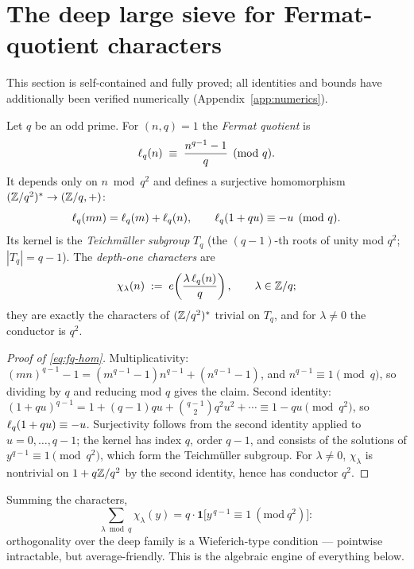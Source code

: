 \section{The deep large sieve for Fermat-quotient characters}\label{sec:dls}

This section is self-contained and fully proved; all identities and bounds
have additionally been verified numerically (Appendix~\ref{app:numerics}).

\begin{definition}\label{def:fq}
Let $q$ be an odd prime. For $(n,q)=1$ the \emph{Fermat quotient} is
\[
\ell_q(n)\;\equiv\;\frac{n^{q-1}-1}{q}\pmod q .
\]
It depends only on $n\bmod q^2$ and defines a surjective homomorphism
$(\mathbb{Z}/q^2)^*\to(\mathbb{Z}/q,+)$:
\begin{equation}\label{eq:fq-hom}
\ell_q(mn)=\ell_q(m)+\ell_q(n),
\qquad
\ell_q(1+qu)\equiv-u\pmod q .
\end{equation}
Its kernel is the \emph{Teichm\"uller subgroup} $T_q$ (the $(q-1)$-th
roots of unity mod $q^2$; $|T_q|=q-1$). The \emph{depth-one characters}
are
\[
\chi_\lambda(n)\;:=\;e\!\left(\frac{\lambda\,\ell_q(n)}{q}\right),\qquad
\lambda\in\mathbb{Z}/q;
\]
they are exactly the characters of $(\mathbb{Z}/q^2)^*$ trivial on $T_q$, and for
$\lambda\ne0$ the conductor is $q^2$.
\end{definition}

\begin{proof}[Proof of \eqref{eq:fq-hom}]
Multiplicativity: $(mn)^{q-1}-1=(m^{q-1}-1)n^{q-1}+(n^{q-1}-1)$, and
$n^{q-1}\equiv1\pmod q$, so dividing by $q$ and reducing mod $q$ gives the
claim. Second identity:
$(1+qu)^{q-1}=1+(q-1)qu+\binom{q-1}{2}q^2u^2+\cdots\equiv1-qu\pmod{q^2}$,
so $\ell_q(1+qu)\equiv-u$. Surjectivity follows from the second identity
applied to $u=0,\ldots,q-1$; the kernel has index $q$, order $q-1$, and
consists of the solutions of $y^{q-1}\equiv1\pmod{q^2}$, which form the
Teichm\"uller subgroup. For $\lambda\ne0$, $\chi_\lambda$ is nontrivial on
$1+q\mathbb{Z}/q^2$ by the second identity, hence has conductor $q^2$.
\end{proof}

\begin{remark}
Summing the characters,
\[
\sum_{\lambda\bmod q}\chi_\lambda(y)
=q\cdot\mathbf 1\big[y^{\,q-1}\equiv1\ (\mathrm{mod}\ q^2)\big]:
\]
orthogonality over the deep family is a Wieferich-type condition ---
pointwise intractable, but average-friendly. This is the algebraic engine
of everything below.
\end{remark}

